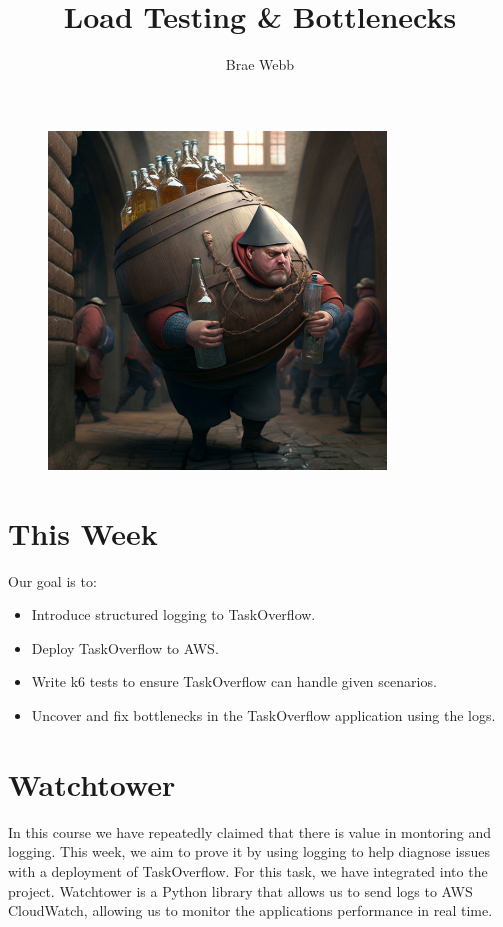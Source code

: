 \documentclass{csse4400}
\title{Load Testing \& Bottlenecks}
\author{Brae Webb}
\date{\week[practical]{9}}
\begin{document}
\maketitle

\begin{figure}[h]
    \centering
    \includegraphics[width=0.8\textwidth]{images/bottleneck}
\end{figure}

\section{This Week}
Our goal is to:
\begin{itemize}
  \item Introduce structured logging to TaskOverflow.
  \item Deploy TaskOverflow to AWS.
  \item Write k6 tests to ensure TaskOverflow can handle given scenarios.
  \item Uncover and fix bottlenecks in the TaskOverflow application using the logs.
\end{itemize}

\section{Watchtower}
In this course we have repeatedly claimed that there is value in montoring and logging.
This week, we aim to prove it by using logging to help diagnose issues with a deployment of TaskOverflow.
For this task, we have integrated  into the project.
Watchtower is a Python library that allows us to send logs to AWS CloudWatch,
allowing us to monitor the applications performance in real time.
\end{document}
